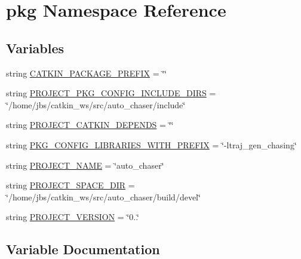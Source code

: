 \hypertarget{namespacepkg}{}\section{pkg Namespace Reference}
\label{namespacepkg}
\subsection*{Variables}
\begin{DoxyCompactItemize}
\item 
string \hyperlink{namespacepkg_ae26c7a5a06b7d738f4d210ca449e6bee}{C\+A\+T\+K\+I\+N\+\_\+\+P\+A\+C\+K\+A\+G\+E\+\_\+\+P\+R\+E\+F\+IX} = \char`\"{}\char`\"{}
\item 
string \hyperlink{namespacepkg_a2760bf8266ff58da440f65ee91b203ab}{P\+R\+O\+J\+E\+C\+T\+\_\+\+P\+K\+G\+\_\+\+C\+O\+N\+F\+I\+G\+\_\+\+I\+N\+C\+L\+U\+D\+E\+\_\+\+D\+I\+RS} = \char`\"{}/home/jbs/catkin\+\_\+ws/src/auto\+\_\+chaser/include\char`\"{}
\item 
string \hyperlink{namespacepkg_a17c18447fad253ee1c0d76deec88028c}{P\+R\+O\+J\+E\+C\+T\+\_\+\+C\+A\+T\+K\+I\+N\+\_\+\+D\+E\+P\+E\+N\+DS} = \char`\"{}\char`\"{}
\item 
string \hyperlink{namespacepkg_a433e30cecb4a0123a7c4b384d168e336}{P\+K\+G\+\_\+\+C\+O\+N\+F\+I\+G\+\_\+\+L\+I\+B\+R\+A\+R\+I\+E\+S\+\_\+\+W\+I\+T\+H\+\_\+\+P\+R\+E\+F\+IX} = \char`\"{}-\/ltraj\+\_\+gen\+\_\+chasing\char`\"{}
\item 
string \hyperlink{namespacepkg_a7dfbe99257c26f5e4a3a5483995d9ddc}{P\+R\+O\+J\+E\+C\+T\+\_\+\+N\+A\+ME} = \char`\"{}auto\+\_\+chaser\char`\"{}
\item 
string \hyperlink{namespacepkg_a3f0f1b4bc03c596525e025539ca4332f}{P\+R\+O\+J\+E\+C\+T\+\_\+\+S\+P\+A\+C\+E\+\_\+\+D\+IR} = \char`\"{}/home/jbs/catkin\+\_\+ws/src/auto\+\_\+chaser/build/devel\char`\"{}
\item 
string \hyperlink{namespacepkg_ab1037914b9286bb61855131c06149648}{P\+R\+O\+J\+E\+C\+T\+\_\+\+V\+E\+R\+S\+I\+ON} = \char`\"{}0..\char`\"{}
\end{DoxyCompactItemize}


\subsection{Variable Documentation}
